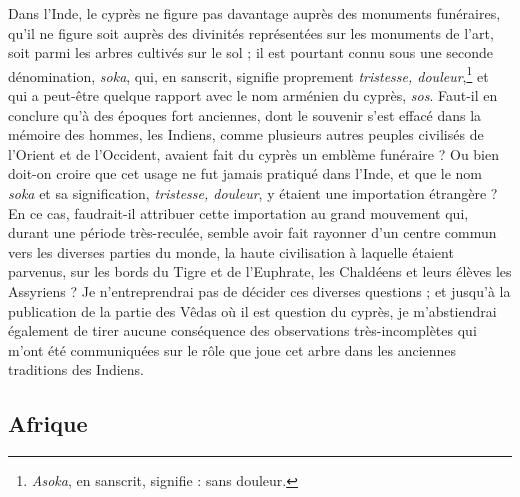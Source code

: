 \documentclass[a4paper, 11pt, oneside, polutonikogreek, french]{article}
\begin{document}
Dans l'Inde, le cyprès ne figure pas davantage auprès des monuments funéraires, qu'il ne figure soit auprès des divinités représentées sur les monuments de l'art, soit parmi les arbres cultivés sur le sol ; il est pourtant connu sous une seconde dénomination, \emph{soka}, qui, en sanscrit, signifie proprement \emph{tristesse, douleur},\footnote{\emph{Asoka}, en sanscrit, signifie : sans douleur.} et qui a peut-être quelque rapport avec le nom arménien du cyprès, \emph{sos}. Faut-il en conclure qu'à des époques fort anciennes, dont le souvenir s'est effacé dans la mémoire des hommes, les Indiens, comme plusieurs autres peuples civilisés de l'Orient et de l'Occident, avaient fait du cyprès un emblème funéraire ? Ou bien doit-on croire que cet usage ne fut jamais pratiqué dans l'Inde, et que le nom \emph{soka} et sa signification, \emph{tristesse, douleur}, y étaient une importation étrangère ? En ce cas, faudrait-il attribuer cette importation au grand mouvement qui, durant une période très-reculée, semble avoir fait rayonner d'un centre commun vers les diverses parties du monde, la haute civilisation à laquelle étaient parvenus, sur les bords du Tigre et de l'Euphrate, les Chaldéens et leurs élèves les Assyriens ? Je n'entreprendrai pas de décider ces diverses questions ; et jusqu'à la publication de la partie des Vêdas où il est question du cyprès, je m'abstiendrai également de tirer aucune conséquence des observations très-incomplètes qui m'ont été communiquées sur le rôle que joue cet arbre dans les anciennes traditions des Indiens.
\clearpage
\subsection{Afrique}
\end{document}
